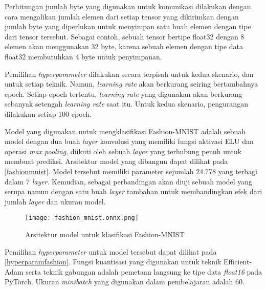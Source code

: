 Perhitungan jumlah byte yang digunakan untuk komunikasi dilakukan dengan cara mengalikan jumlah elemen dari setiap tensor yang dikirimkan dengan jumlah byte yang diperlukan untuk menyimpan satu buah elemen dengan tipe dari tensor tersebut. Sebagai contoh, sebuah tensor bertipe float32 dengan 8 elemen akan menggunakan 32 byte, karena sebuah elemen dengan tipe data float32 membutuhkan 4 byte untuk penyimpanan.

Pemilihan \emph{hyperparameter} dilakukan secara terpisah untuk kedua skenario, dan untuk setiap teknik. Namun, \emph{learning rate} akan berkurang seiring bertambahnya epoch. Setiap epoch tertentu, \emph{learning rate} yang digunakan akan berkurang sebanyak setengah \emph{learning rate} saat itu. Untuk kedua skenario, pengurangan dilakukan setiap 100 epoch.

Model yang digunakan untuk mengklasifikasi Fashion-MNIST adalah sebuah model dengan dua buah \emph{layer} konvolusi yang memiliki fungsi aktivasi ELU dan operasi \emph{max pooling}, diikuti oleh sebuah \emph{layer} yang terhubung penuh untuk membuat prediksi. Arsitektur model yang dibangun dapat dilihat pada \autoref{fashionmnist}. Model tersebut memiliki parameter sejumlah 24.778 yang terbagi dalam 7 \emph{layer}. Kemudian, sebagai perbandingan akan diuji sebuah model yang serupa namun dengan satu buah \emph{layer} tambahan untuk membandingkan efek dari jumlah \emph{layer} dan ukuran model.

\begin{figure}
  \centering
  \texttt{[image: fashion\_mnist.onnx.png]}
  \caption{Arsitektur model untuk klasifikasi Fashion-MNIST}\label{fashionmnist}
\end{figure}

Pemilihan \emph{hyperparameter} untuk model tersebut dapat dilihat pada \autoref{hyperparamfashion}. Fungsi kuantisasi yang digunakan untuk teknik Efficient-Adam serta teknik gabungan adalah pemetaan langsung ke tipe data \emph{float16} pada PyTorch. Ukuran \emph{minibatch} yang digunakan dalam pembelajaran adalah 60.

